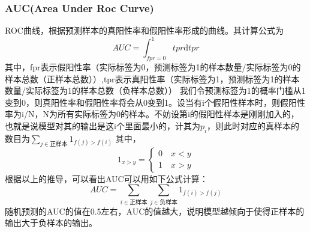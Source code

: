 \subsubsection{AUC(Area Under Roc Curve)}
ROC曲线，根据预测样本的真阳性率和假阳性率形成的曲线。其计算公式为
\[
    AUC = \int_{fpr=0}^1 tpr \mathrm{d}tpr
\]
其中，fpr表示假阳性率（实际标签为0，预测标签为1的样本数量/实际标签为0的样本总数（正样本总数））,tpr表示真阳性率（实际标签为1，预测标签为1的样本数量/实际标签为1的样本总数（负样本总数））
我们令预测标签为1的概率门槛从1变到0，则真阳性率和假阳性率将会从0变到1。设当有i个假阳性样本时，则假阳性率为i/N，N为所有实际标签为0的样本。不妨设第i的假阳性样本是刚刚加入的，也就是说模型对其的输出是这i个里面最小的，计其为$p_i$，则此时对应的真样本的数目为$\sum\limits_{j \in \text{正样本}} 1_{f(j) > f(i)}$
其中，
\[
1_{x>y} =\begin{cases}  0 \quad x<y \\ 1 \quad x>y \end{cases}
\]
根据以上的推导，可以看出AUC可以用如下公式计算：
\[
    AUC = \sum\limits_{i \in \text{正样本} } \sum\limits_{j \in \text{负样本} }{1_{f(i)>f(j)}}
\]
随机预测的AUC的值在0.5左右，AUC的值越大，说明模型越倾向于使得正样本的输出大于负样本的输出。